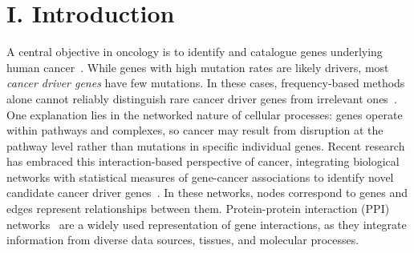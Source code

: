 \documentclass[
  reprint,
  superscriptaddress,
  amsmath,amssymb,
  aps,prl,
]{revtex4-2}
\begin{document}
\maketitle


\section{I. Introduction}
%
%
\noindent A central objective in oncology is to identify and catalogue genes underlying human cancer~\cite{garraway2013lessons, vogelstein2013cancer, frampton2013development}. While genes with high mutation rates are likely drivers, most \textit{cancer driver genes} have few mutations. In these cases, frequency-based methods alone cannot reliably distinguish rare cancer driver genes from irrelevant ones~\cite{vogelstein2013cancer}.
One explanation lies in the networked nature of cellular processes: genes operate within pathways and complexes, so cancer may result from disruption at the pathway level rather than mutations in specific individual genes. Recent research has embraced this interaction-based perspective of cancer, integrating biological networks with statistical measures of gene-cancer associations to identify novel candidate cancer driver genes~\cite{horn2018netsig, reyna2018hierarchical, kovacs2019network, cheng2019network}.
In these networks, nodes correspond to genes and edges represent relationships between them. Protein-protein interaction (PPI) networks~\cite{lage2007human, li2017scored, szklarczyk2019string} are a widely used representation of gene interactions, as they integrate information from diverse data sources, tissues, and molecular processes.
\end{document}
